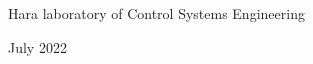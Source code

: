 \documentclass[12pt, oneside]{book}
\newcommand\blankpage{%
    \null
    \thispagestyle{empty}%
    \addtocounter{page}{-1}%
    \newpage}
\begin{document}
\begin{titlepage}
\begin{center}
    {\large Hara laboratory of Control Systems Engineering}



    \vfill

    July 2022


  \end{center}
\end{titlepage}


\mainmatter



\afterpage{\blankpage}

\end{document}
